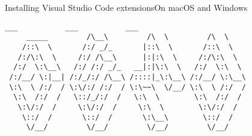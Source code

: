 \documentclass[aspectratio=169]{beamer}
\begin{document}
\begin{frame}[fragile]{Installing Visual Studio Code extensions}{On macOS and Windows}
    \begin{Verbatim}[fontsize=\footnotesize]
                    ___           ___           ___     
     _____         /\__\         /\  \         /\  \    
    /::\  \       /:/ _/_       |::\  \       /::\  \   
   /:/\:\  \     /:/ /\__\      |:|:\  \     /:/\:\  \  
  /:/  \:\__\   /:/ /:/ _/_   __|:|\:\  \   /:/  \:\  \ 
 /:/__/ \:|__| /:/_/:/ /\__\ /::::|_\:\__\ /:/__/ \:\__\
 \:\  \ /:/  / \:\/:/ /:/  / \:\~~\  \/__/ \:\  \ /:/  /
  \:\  /:/  /   \::/_/:/  /   \:\  \        \:\  /:/  / 
   \:\/:/  /     \:\/:/  /     \:\  \        \:\/:/  /  
    \::/  /       \::/  /       \:\__\        \::/  /   
     \/__/         \/__/         \/__/         \/__/    
    \end{Verbatim}
\end{frame}
\end{document}
